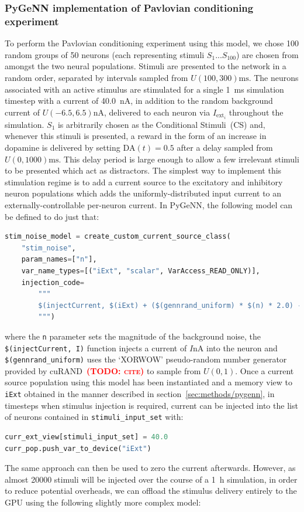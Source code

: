 \documentclass[utf8]{frontiersSCNS} %
\newcommand{\todo}[1]{\textbf{\textsc{\textcolor{red}{(TODO: #1)}}}}
\begin{document}
\subsubsection{PyGeNN implementation of Pavlovian conditioning experiment}
To perform the Pavlovian conditioning experiment using this model, we chose \num{100} random groups of \num{50} neurons (each representing stimuli $S_{1}$...$S_{100}$) are chosen from amongst the two neural populations.
Stimuli are presented to the network in a random order, separated by intervals sampled from $U(100, 300) \si{\milli\second}$.
The neurons associated with an active stimulus are stimulated for a single \SI{1}{\milli\second} simulation timestep with a current of \SI{40.0}{\nano\ampere}, in addition to the random background current of $U(-6.5,6.5) \si{\nano\ampere}$, delivered to each neuron via $I_{\text{ext}_{i}}$ throughout the simulation.
$S_{1}$ is arbitrarily chosen as the Conditional Stimuli~(CS) and, whenever this stimuli is presented, a reward in the form of an increase in dopamine is delivered by setting $\text{DA}(t)=0.5$ after a delay sampled from $U(0, 1000) \si{\milli\second}$.
This delay period is large enough to allow a few irrelevant stimuli to be presented which act as distractors.
The simplest way to implement this stimulation regime is to add a current source to the excitatory and inhibitory neuron populations which adds the uniformly-distributed input current to an externally-controllable per-neuron current.
In PyGeNN, the following model can be defined to do just that:
\begin{lstlisting}[language=python]
stim_noise_model = create_custom_current_source_class(
    "stim_noise",
    param_names=["n"],
    var_name_types=[("iExt", "scalar", VarAccess_READ_ONLY)],
    injection_code=
        """
        $(injectCurrent, $(iExt) + ($(gennrand_uniform) * $(n) * 2.0) - $(n));
        """)
\end{lstlisting}

where the \lstinline{n} parameter sets the magnitude of the background noise, the \lstinline{$(injectCurrent, I)} function injects a current of $I\si{\nano\ampere}$ into the neuron and \lstinline{$(gennrand_uniform)} uses the `XORWOW' pseudo-random number generator provided by cuRAND~\todo{cite} to sample from $U(0,1)$. 
Once a current source population using this model has been instantiated and a memory view to \lstinline{iExt} obtained in the manner described in section~\ref{sec:methods/pygenn}, in timesteps when stimulus injection is required, current can be injected into the list of neurons contained in \lstinline{stimuli_input_set} with:
\begin{lstlisting}[language=python]
curr_ext_view[stimuli_input_set] = 40.0
curr_pop.push_var_to_device("iExt")
\end{lstlisting}
The same approach can then be used to zero the current afterwards.
However, as almost \num{20000} stimuli will be injected over the course of a \SI{1}{\hour} simulation, in order to reduce potential overheads, we can offload the stimulus delivery entirely to the GPU using the following slightly more complex model:
\end{document}
